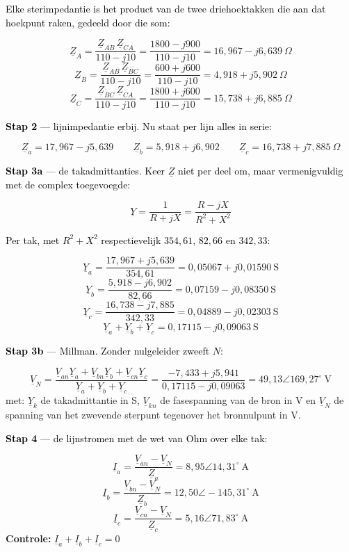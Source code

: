 \documentclass[a4paper,11pt]{article}
\newcommand{\stapreden}[1]{\par\vspace{1.4mm}\noindent\textcolor{black}{#1}\par\vspace{-2mm}}
\begin{document}
\begin{oefenblok}
    \stapreden{Elke sterimpedantie is het product van de twee driehoektakken die aan dat hoekpunt
        raken, gedeeld door die som:}
    \[\underline{Z}_A = \frac{\underline{Z}_{AB}\,\underline{Z}_{CA}}{110-j10}
        = \frac{1800-j900}{110-j10} = 16{,}967 - j6{,}639\ \Omega\]
    \[\underline{Z}_B = \frac{\underline{Z}_{AB}\,\underline{Z}_{BC}}{110-j10}
        = \frac{600+j600}{110-j10} = 4{,}918 + j5{,}902\ \Omega\]
    \[\underline{Z}_C = \frac{\underline{Z}_{BC}\,\underline{Z}_{CA}}{110-j10}
        = \frac{1800+j600}{110-j10} = 15{,}738 + j6{,}885\ \Omega\]

    \stapreden{\textbf{Stap 2} --- lijnimpedantie erbij. Nu staat per lijn alles in serie:}
    \[\underline{Z}_a = 17{,}967 - j5{,}639 \qquad
        \underline{Z}_b = 5{,}918 + j6{,}902 \qquad
        \underline{Z}_c = 16{,}738 + j7{,}885\ \Omega\]

    \stapreden{\textbf{Stap 3a} --- de takadmittanties. Keer $\underline{Z}$ niet per deel om, maar
        vermenigvuldig met de complex toegevoegde:}
    \[\underline{Y} = \frac{1}{R + jX} = \frac{R - jX}{R^2 + X^2}\]

    \stapreden{Per tak, met $R^2+X^2$ respectievelijk $354{,}61$, $82{,}66$ en $342{,}33$:}
    \[\underline{Y}_a = \frac{17{,}967 + j5{,}639}{354{,}61} = 0{,}05067 + j0{,}01590\ \text{S}\]
    \[\underline{Y}_b = \frac{5{,}918 - j6{,}902}{82{,}66} = 0{,}07159 - j0{,}08350\ \text{S}\]
    \[\underline{Y}_c = \frac{16{,}738 - j7{,}885}{342{,}33} = 0{,}04889 - j0{,}02303\ \text{S}\]
    \[\underline{Y}_a + \underline{Y}_b + \underline{Y}_c = 0{,}17115 - j0{,}09063\ \text{S}\]

    \stapreden{\textbf{Stap 3b} --- Millman. Zonder nulgeleider zweeft $N$:}
    \[\underline{V}_N = \frac{\underline{V}_{an}\underline{Y}_a + \underline{V}_{bn}\underline{Y}_b + \underline{V}_{cn}\underline{Y}_c}
        {\underline{Y}_a + \underline{Y}_b + \underline{Y}_c}
        = \frac{-7{,}433 + j5{,}941}{0{,}17115 - j0{,}09063}
        = \boxed{49{,}13\angle 169{,}27^\circ\ \text{V}}\]
    met: $\underline{Y}_k$ de takadmittantie in S, $\underline{V}_{kn}$ de fasespanning van de bron
    in V en $\underline{V}_N$ de spanning van het zwevende sterpunt tegenover het bronnulpunt in V.

    \stapreden{\textbf{Stap 4} --- de lijnstromen met de wet van Ohm over elke tak:}
    \[\underline{I}_a = \frac{\underline{V}_{an} - \underline{V}_N}{\underline{Z}_a} = \boxed{8{,}95\angle 14{,}31^\circ\ \text{A}}\]
    \[\underline{I}_b = \frac{\underline{V}_{bn} - \underline{V}_N}{\underline{Z}_b} = \boxed{12{,}50\angle -145{,}31^\circ\ \text{A}}\]
    \[\underline{I}_c = \frac{\underline{V}_{cn} - \underline{V}_N}{\underline{Z}_c} = \boxed{5{,}16\angle 71{,}83^\circ\ \text{A}}\]
    \textbf{Controle:} $\underline{I}_a + \underline{I}_b + \underline{I}_c = 0$ \checkmark


\end{oefenblok}
\end{document}
